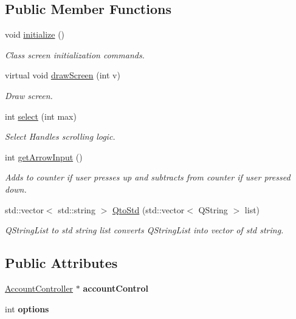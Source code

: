 \subsection*{Public Member Functions}
\begin{DoxyCompactItemize}
\item 
void \hyperlink{classScreen_a8f7d73396fe312fd9980d7e2ecafc16b}{initialize} ()\hypertarget{classScreen_a8f7d73396fe312fd9980d7e2ecafc16b}{}\label{classScreen_a8f7d73396fe312fd9980d7e2ecafc16b}

\begin{DoxyCompactList}\small\item\em Class screen initialization commands. \end{DoxyCompactList}\item 
virtual void \hyperlink{classScreen_a7c48a93c2b9d4bdb92349e68d8f88c5e}{draw\+Screen} (int v)
\begin{DoxyCompactList}\small\item\em Draw screen. \end{DoxyCompactList}\item 
int \hyperlink{classScreen_afcf54b70cce015db5a7874876df8df60}{select} (int max)
\begin{DoxyCompactList}\small\item\em Select Handles scrolling logic. \end{DoxyCompactList}\item 
int \hyperlink{classScreen_af85f0c544a0ac1a4702032007a8dd13c}{get\+Arrow\+Input} ()\hypertarget{classScreen_af85f0c544a0ac1a4702032007a8dd13c}{}\label{classScreen_af85f0c544a0ac1a4702032007a8dd13c}

\begin{DoxyCompactList}\small\item\em Adds to counter if user presses up and subtracts from counter if user pressed down. \end{DoxyCompactList}\item 
std\+::vector$<$ std\+::string $>$ \hyperlink{classScreen_a4f8e8b8e14d79db272df3df177304649}{Qto\+Std} (std\+::vector$<$ Q\+String $>$ list)
\begin{DoxyCompactList}\small\item\em Q\+String\+List to std string list converts Q\+String\+List into vector of std string. \end{DoxyCompactList}\end{DoxyCompactItemize}
\subsection*{Public Attributes}
\begin{DoxyCompactItemize}
\item 
\hyperlink{classAccountController}{Account\+Controller} $\ast$ {\bfseries account\+Control}\hypertarget{classScreen_a84e1528164e6e3cf16c9efd0aa916ad6}{}\label{classScreen_a84e1528164e6e3cf16c9efd0aa916ad6}

\item 
int {\bfseries options}\hypertarget{classScreen_a0750c40311f442483756627395991c8b}{}\label{classScreen_a0750c40311f442483756627395991c8b}

\end{DoxyCompactItemize}



